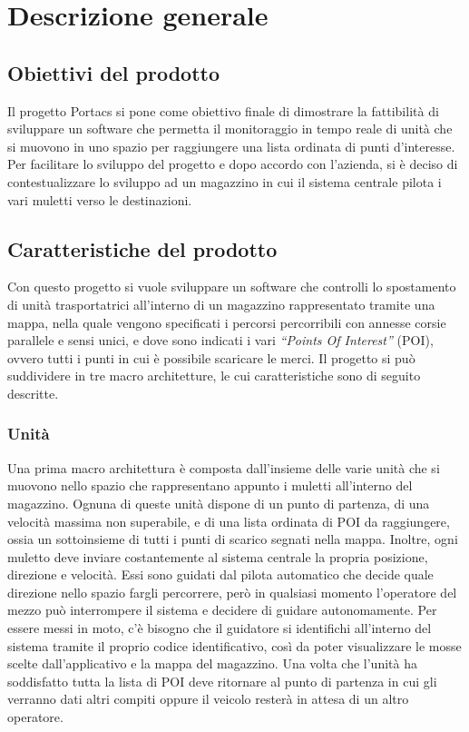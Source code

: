 \section{Descrizione generale}

\subsection{Obiettivi del prodotto}
Il progetto Portacs si pone come obiettivo finale di dimostrare la fattibilità di sviluppare un software che permetta il monitoraggio in tempo reale di unità che si muovono in uno spazio per raggiungere una lista ordinata di punti d’interesse. Per facilitare lo sviluppo del progetto e dopo accordo con l'azienda, si è deciso di contestualizzare lo sviluppo ad un magazzino in cui il sistema centrale pilota i vari muletti verso le destinazioni.

\subsection{Caratteristiche del prodotto}
Con questo progetto si vuole sviluppare un software che controlli lo spostamento di unità trasportatrici all’interno di un magazzino rappresentato tramite una mappa, nella quale vengono specificati i percorsi percorribili con annesse corsie parallele e sensi unici, e dove sono indicati i vari \textit{“Points Of Interest”} (POI), ovvero tutti i punti in cui è possibile scaricare le merci. 
Il progetto si può suddividere in tre macro architetture, le cui caratteristiche sono di seguito descritte.
\subsubsection{Unità}
Una prima macro architettura è composta dall’insieme delle varie unità che si muovono nello spazio che rappresentano appunto i muletti all'interno del magazzino. Ognuna di queste unità dispone di un punto di partenza, di una velocità massima non superabile, e di una lista ordinata di POI da raggiungere, ossia un sottoinsieme di tutti i punti di scarico segnati nella mappa.
Inoltre, ogni muletto deve inviare costantemente al sistema centrale la propria posizione, direzione e velocità.
Essi sono guidati dal pilota automatico che decide quale direzione nello spazio fargli percorrere, però in qualsiasi momento l'operatore del mezzo può interrompere il sistema e decidere di guidare autonomamente. 
Per essere messi in moto, c'è bisogno che il guidatore si identifichi all'interno del sistema tramite il proprio codice identificativo, così da poter visualizzare le mosse scelte dall'applicativo e la mappa del magazzino.
Una volta che l'unità ha soddisfatto tutta la lista di POI deve ritornare al punto di partenza in cui gli verranno dati altri compiti oppure il veicolo resterà in attesa di un altro operatore.

